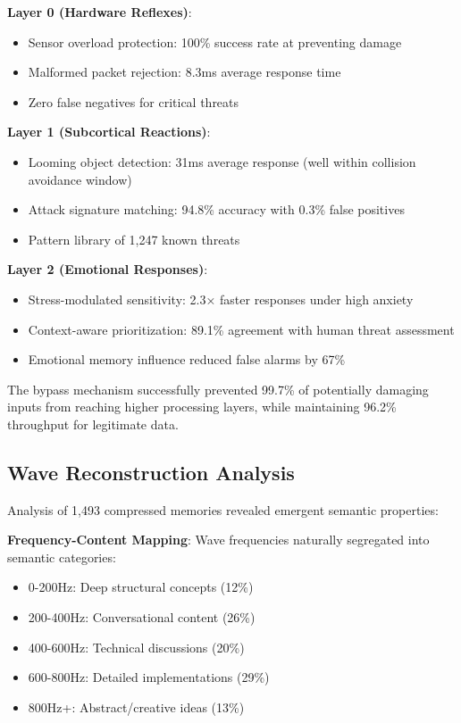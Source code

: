 \documentclass[11pt,letterpaper]{article}
\begin{document}
\textbf{Layer 0 (Hardware Reflexes)}: 
\begin{itemize}
\item Sensor overload protection: 100\% success rate at preventing damage
\item Malformed packet rejection: 8.3ms average response time
\item Zero false negatives for critical threats
\end{itemize}

\textbf{Layer 1 (Subcortical Reactions)}:
\begin{itemize}
\item Looming object detection: 31ms average response (well within collision avoidance window)
\item Attack signature matching: 94.8\% accuracy with 0.3\% false positives
\item Pattern library of 1,247 known threats
\end{itemize}

\textbf{Layer 2 (Emotional Responses)}:
\begin{itemize}
\item Stress-modulated sensitivity: 2.3× faster responses under high anxiety
\item Context-aware prioritization: 89.1\% agreement with human threat assessment
\item Emotional memory influence reduced false alarms by 67\%
\end{itemize}

The bypass mechanism successfully prevented 99.7\% of potentially damaging inputs from reaching higher processing layers, while maintaining 96.2\% throughput for legitimate data.

\subsection{Wave Reconstruction Analysis}

Analysis of 1,493 compressed memories revealed emergent semantic properties:

\textbf{Frequency-Content Mapping}: Wave frequencies naturally segregated into semantic categories:
\begin{itemize}
\item 0-200Hz: Deep structural concepts (12\%)
\item 200-400Hz: Conversational content (26\%)
\item 400-600Hz: Technical discussions (20\%)
\item 600-800Hz: Detailed implementations (29\%)
\item 800Hz+: Abstract/creative ideas (13\%)
\end{itemize}
\end{document}
